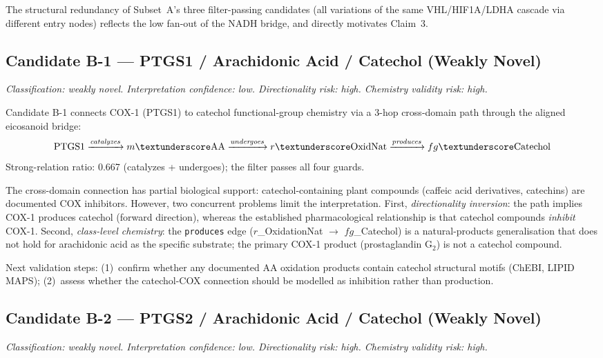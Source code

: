 The structural redundancy of Subset~A's three filter-passing candidates
(all variations of the same VHL/HIF1A/LDHA cascade via different entry nodes)
reflects the low fan-out of the NADH bridge, and directly motivates Claim~3.

\subsection{Candidate B-1 --- PTGS1 / Arachidonic Acid / Catechol (Weakly Novel)}
\label{cs:b1}

\textit{Classification: weakly novel.
Interpretation confidence: low.
Directionality risk: high. Chemistry validity risk: high.}

\smallskip
Candidate B-1 connects COX-1 (PTGS1) to catechol functional-group chemistry
via a 3-hop cross-domain path through the aligned eicosanoid bridge:
\[
  \mathrm{PTGS1} \xrightarrow{\textit{catalyzes}}
  m\textunderscore\mathrm{AA} \xrightarrow{\textit{undergoes}}
  r\textunderscore\mathrm{OxidNat} \xrightarrow{\textit{produces}}
  fg\textunderscore\mathrm{Catechol}
\]
Strong-relation ratio: 0.667 (catalyzes + undergoes); the filter passes all four guards.

The cross-domain connection has partial biological support: catechol-containing plant
compounds (caffeic acid derivatives, catechins) are documented COX inhibitors.
However, two concurrent problems limit the interpretation.
First, \textit{directionality inversion}: the path implies COX-1 produces catechol
(forward direction), whereas the established pharmacological relationship is that
catechol compounds \textit{inhibit} COX-1.
Second, \textit{class-level chemistry}: the \texttt{produces} edge
($r$\_OxidationNat $\to$ $fg$\_Catechol) is a natural-products generalisation that
does not hold for arachidonic acid as the specific substrate;
the primary COX-1 product (prostaglandin G$_2$) is not a catechol compound.

Next validation steps: (1)~confirm whether any documented AA oxidation products
contain catechol structural motifs (ChEBI, LIPID MAPS); (2)~assess whether the
catechol-COX connection should be modelled as inhibition rather than production.

\subsection{Candidate B-2 --- PTGS2 / Arachidonic Acid / Catechol (Weakly Novel)}
\label{cs:b2}

\textit{Classification: weakly novel.
Interpretation confidence: low.
Directionality risk: high. Chemistry validity risk: high.}

